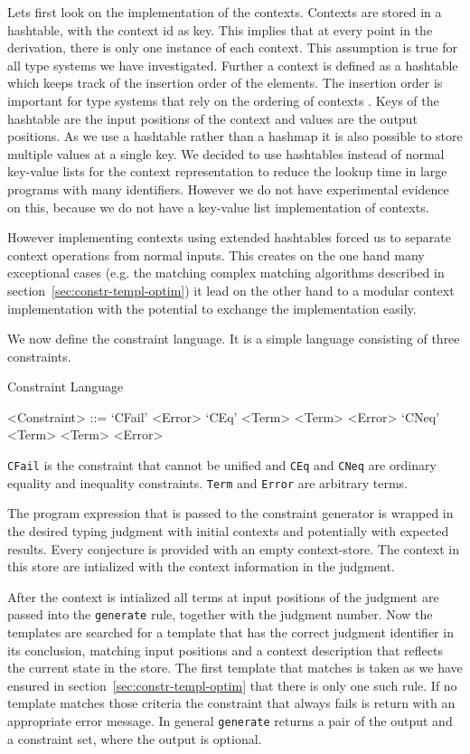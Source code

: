 Lets first look on the implementation of the contexts. Contexts are
stored in a hashtable, with the context id as key. This implies that
at every point in the derivation, there is only one instance of each
context. This assumption is true for all type systems we have
investigated. Further a context is defined as a hashtable which keeps
track of the insertion order of the elements. The insertion order is
important for type systems that rely on the ordering of contexts
. Keys of the hashtable are the input positions of the
context and values are the output positions. As we use a hashtable
rather than a hashmap it is also possible to store multiple values at
a single key. We decided to use hashtables instead of normal key-value
lists for the context representation to reduce the lookup time in
large programs with many identifiers. However we do not have
experimental evidence on this, because we do not have a key-value list
implementation of contexts.

However implementing contexts using extended hashtables forced us to
separate context operations from normal inputs. This creates on the
one hand many exceptional cases (e.g. the matching complex matching
algorithms described in section~\ref{sec:constr-templ-optim}) it lead
on the other hand to a modular context implementation with the
potential to exchange the implementation easily.

We now define the constraint language. It is a simple language
consisting of three constraints.

\begin{definition}{Constraint Language}
  \begin{grammar}
    <Constraint> ::= `CFail' <Error>
    \alt `CEq' <Term> <Term> <Error>
    \alt `CNeq' <Term> <Term> <Error>
  \end{grammar}
\end{definition}

\verb|CFail| is the constraint that cannot be unified and \verb|CEq|
and \verb|CNeq| are ordinary equality and inequality
constraints. \verb|Term| and \verb|Error| are arbitrary terms.

The program expression that is passed to the constraint generator is
wrapped in the desired typing judgment with initial contexts and
potentially with expected results. Every conjecture is provided with
an empty context-store. The context in this store are intialized with
the context information in the judgment.

After the context is intialized all terms at input positions of the
judgment are passed into the \verb|generate| rule, together with the
judgment number. Now the templates are searched for a template that has the
correct judgment identifier in its conclusion, matching input
positions and a context description that reflects the current state in
the store. The first template that matches is taken as we have ensured
in section~\ref{sec:constr-templ-optim} that there is only one such
rule. If no template matches those criteria the constraint that always
fails is return with an appropriate error message. In general
\verb|generate| returns a pair of the output and a constraint set,
where the output is optional. 

